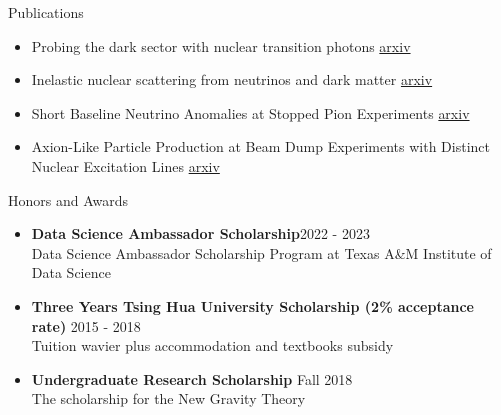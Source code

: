 \documentclass{resume}
\begin{document}
\begin{rSection}{Publications}
    \begin{itemize}
        \item Probing the dark sector with nuclear transition photons \hfill \href{https://arxiv.org/pdf/2302.10250.pdf}{arxiv}
        \item Inelastic nuclear scattering from neutrinos and dark matter \hfill \href{https://arxiv.org/pdf/2206.08590.pdf}{arxiv}
        \item Short Baseline Neutrino Anomalies at Stopped Pion Experiments \hfill \href{https://arxiv.org/abs/2310.13194}{arxiv}
        \item Axion-Like Particle Production at Beam Dump Experiments with Distinct Nuclear Excitation Lines \hfill \href{https://arxiv.org/pdf/2207.13659.pdf}{arxiv}
    \end{itemize}
\end{rSection}


\begin{rSection}{Honors and Awards}
    \begin{itemize}
        \item \textbf{Data Science Ambassador Scholarship}\hfill 2022 - 2023\\
        Data Science Ambassador Scholarship Program at Texas A\&M Institute of Data Science
        \item \textbf{Three Years Tsing Hua University Scholarship (2\% acceptance rate)} \hfill 2015 - 2018 \\
        Tuition wavier plus accommodation and textbooks subsidy
        \item \textbf{Undergraduate Research Scholarship} \hfill Fall 2018 \\
        The scholarship for the New Gravity Theory
    \end{itemize}
\end{rSection}
\end{document}
